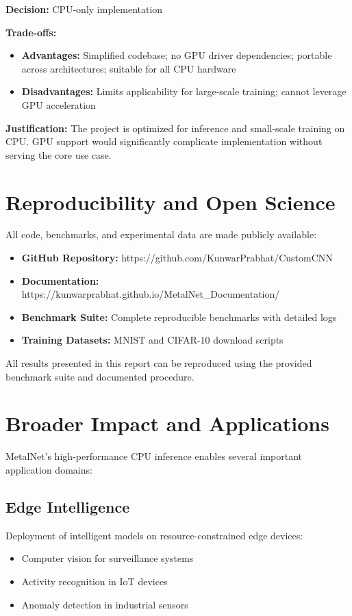 \documentclass[12pt,oneside,a4paper]{report}
\begin{document}
\textbf{Decision:} CPU-only implementation

\textbf{Trade-offs:}
\begin{itemize}
    \item \textbf{Advantages:} Simplified codebase; no GPU driver dependencies; portable across architectures; suitable for all CPU hardware
    \item \textbf{Disadvantages:} Limits applicability for large-scale training; cannot leverage GPU acceleration
\end{itemize}

\textbf{Justification:} The project is optimized for inference and small-scale training on CPU. GPU support would significantly complicate implementation without serving the core use case.

\section{Reproducibility and Open Science}

All code, benchmarks, and experimental data are made publicly available:

\begin{itemize}
    \item \textbf{GitHub Repository:} https://github.com/KunwarPrabhat/CustomCNN
    \item \textbf{Documentation:} https://kunwarprabhat.github.io/MetalNet\_Documentation/
    \item \textbf{Benchmark Suite:} Complete reproducible benchmarks with detailed logs
    \item \textbf{Training Datasets:} MNIST and CIFAR-10 download scripts
\end{itemize}

All results presented in this report can be reproduced using the provided benchmark suite and documented procedure.

\section{Broader Impact and Applications}

MetalNet's high-performance CPU inference enables several important application domains:

\subsection{Edge Intelligence}

Deployment of intelligent models on resource-constrained edge devices:
\begin{itemize}
    \item Computer vision for surveillance systems
    \item Activity recognition in IoT devices
    \item Anomaly detection in industrial sensors
\end{itemize}
\end{document}

